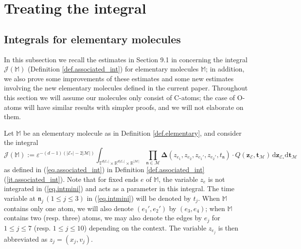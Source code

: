 \documentclass[10pt, reqno]{amsart}
\newcommand{\Mb}{\mathbb M}
\newcommand{\Rb}{\mathbb R}
\newcommand{\Tb}{\mathbb T}
\newcommand{\Ec}{\mathcal E}
\newcommand {\Jc}{\mathcal J}
\renewcommand{\Mc}{\mathcal M}
\newcommand{\nf}{\mathfrak n}
\newcommand{\vz}{\boldsymbol{z}}
\newcommand{\vt}{\boldsymbol{t}}
\theoremstyle{definition}
\theoremstyle{remark}
\numberwithin{equation}{section}
\begin{document}
\section{Treating the integral}\label{sec.integral}
\subsection{Integrals for elementary molecules}\label{sec.elem_int} In this subsection we recall the estimates in Section 9.1 in \cite{DHM24} concerning the integral $\Jc(\Mb)$ (Definition \ref{def.associated_int}) for elementary molecules $\Mb$; in addition, we also prove some improvements of these estimates and some new estimates involving the new elementary molecules defined in the current paper. Throughout this section we will assume our molecules only consist of C-atoms; the case of O-atoms will have similar results with simpler proofs, and we will not elaborate on them.

Let $\Mb$ be an elementary molecule as in Definition \ref{def.elementary}, and consider the integral
\begin{equation}\label{eq.intmini}\Jc(\Mb):=\varepsilon^{-(d-1)(|\Ec_*|-2|\Mc|)}\int_{\Tb^{d|\Ec_*|}\times\Rb^{d|\Ec_*|}\times\Rb^{|\Mc|}}\prod_{\nf\in\Mc}\boldsymbol{\Delta}(z_{e_1},z_{e_2},z_{e_1'},z_{e_2'},t_\nf)\cdot Q(\vz_\Ec,\vt_\Mc)\,\mathrm{d}\vz_{\Ec_*}\mathrm{d}\vt_\Mc
\end{equation} as defined in (\ref{eq.associated_int}) in Definition \ref{def.associated_int} (\ref{it.associated_int}). Note that for fixed ends $e$ of $\Mb$, the variable $z_e$ is not integrated in (\ref{eq.intmini}) and acts as a parameter in this integral. The time variable at $\nf_j\,(1\leq j\leq 3)$ in (\ref{eq.intmini}) will be denoted by $t_j$. When $\Mb$ contains only one atom, we will also denote $(e_1',e_2')$ by $(e_3,e_4)$; when $\Mb$ contains two (resp. three) atoms, we may also denote the edges by $e_j$ for $1\leq j\leq 7$ (resp. $1\leq j\leq 10$) depending on the context. The variable $z_{e_j}$ is then abbreviated as $z_j=(x_j,v_j)$.
\end{document}
